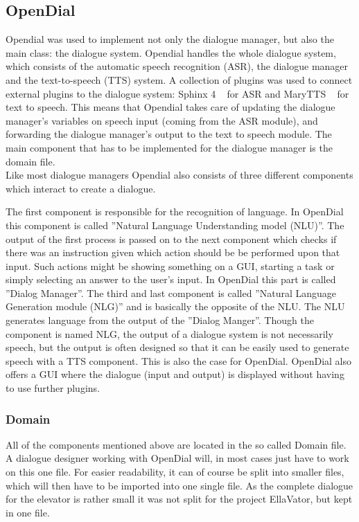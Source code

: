 \documentclass[a4paper, 12pt]{article}
\begin{document}
\subsection{OpenDial}
\label{sec:opendial}
Opendial was used to implement not only the dialogue manager,  but also the main class: the dialogue system.
Opendial handles the whole dialogue system, which consists of the automatic speech recognition (ASR), the dialogue manager and the text-to-speech (TTS) system.
A collection of plugins was used to connect external plugins to the dialogue system: Sphinx 4 ~\cite{Walker:2004:SFO:1698193} for ASR and MaryTTS ~\cite{marytts} for text to speech.
This means that Opendial takes care of updating the dialogue manager's variables on speech input (coming from the ASR module), and forwarding the dialogue manager's output to the text to speech module.
The main component that has to be implemented for the dialogue manager is the domain file. \\
\indent Like most dialogue managers Opendial also consists of three different components which interact to create a dialogue.

The first component is responsible for the recognition of language.
In OpenDial this component is called ”Natural Language Understanding model (NLU)”.
The output of the first process is passed on to the next component which checks if there was an instruction given which action should be be performed upon that input.
Such actions might be showing something on a GUI, starting a task or simply selecting an answer to the user's input.
In OpenDial this part is called ”Dialog Manager”.
The third and last component is called ”Natural Language Generation module (NLG)” and is basically the opposite of the NLU.
The NLU generates language from the output of the ”Dialog Manger”.
Though the component is named NLG, the output of a dialogue system is not necessarily speech, but the output is often designed so that it can be easily used to generate speech with a TTS component.
This is also the case for OpenDial.
OpenDial also offers a GUI where the dialogue (input and output) is displayed without having to use further plugins.

\subsubsection{Domain}

All of the components mentioned above are located in the so called Domain file.
A dialogue designer working with OpenDial will, in most cases just have to work on this one file.
For easier readability, it can of course be split into smaller files, which will then have to be imported into one single file.
As the complete dialogue for the elevator is rather small it was not split for the project EllaVator, but kept in one file. \newline
\end{document}
